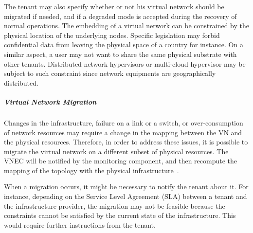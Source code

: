 The tenant may also specify whether or not his virtual network should be migrated if needed, and if a degraded mode is accepted during the recovery of normal operations.
The embedding of a virtual network can be constrained by the physical location of the underlying nodes.
Specific legislation may forbid confidential data from leaving the physical space of a country for instance.
On a similar aspect, a user may not want to share the same physical substrate with other tenants.
Distributed network hypervisors or multi-cloud hypervisor may be subject to such constraint since network equipments are geographically distributed.



\subparagraph{Virtual Network Migration}
Changes in the infrastructure, failure on a link or a switch, or over-consumption of network resources may require a change in the mapping between the VN and the physical resources.
Therefore, in order to address these issues, it is possible to migrate the virtual network on a different subset of physical resources. 
The VNEC will be notified by the monitoring component, and then recompute the mapping of the topology with the physical infrastructure~\cite{VeRTIGO-Corin2012a,AutoSlice-Bozakov2012,CoVisor-Jin2015}.

When a migration occurs, it might be necessary to notify the tenant about it.
For instance, depending on the Service Level Agreement (SLA) between a tenant and the infrastructure provider, the migration may not be feasible because the constraints cannot be satisfied by the current state of the infrastructure. This would require further instructions from the tenant.



